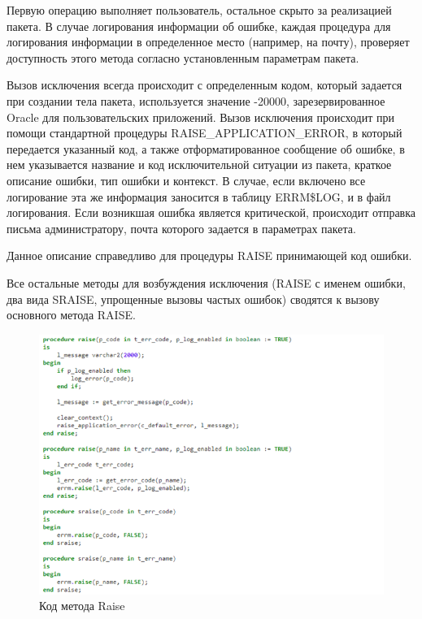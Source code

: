 Первую операцию выполняет пользователь, остальное скрыто за реализацией пакета. В случае логирования информации об ошибке, каждая процедура для логирования информации в определенное место (например, на почту), проверяет доступность этого метода согласно установленным параметрам пакета. 

Вызов исключения всегда происходит с определенным кодом, который задается при создании тела пакета, используется значение -20000, зарезервированное Oracle для пользовательских приложений. Вызов исключения происходит при помощи стандартной процедуры RAISE\_APPLICATION\_ERROR, в который передается указанный код, а также отформатированное сообщение об ошибке, в нем указывается название и код исключительной ситуации из пакета, краткое описание ошибки, тип ошибки и контекст. В случае, если включено все логирование эта же информация заносится в таблицу ERRM\$LOG, и в файл логирования. Если возникшая ошибка является критической, происходит отправка письма администратору, почта которого задается в параметрах пакета. 

Данное описание справедливо для процедуры RAISE принимающей код ошибки. 

Все остальные методы для возбуждения исключения (RAISE с именем ошибки, два вида SRAISE, упрощенные вызовы частых ошибок) сводятся к вызову основного метода RAISE.

\begin{figure}[ht!] 
	\center
	\includegraphics [scale=1] {my_folder/img/c3_raise_code.png}
	\caption{Код метода Raise} 
	\label{fig:c3_raise_code}  
\end{figure}
\FloatBarrier

